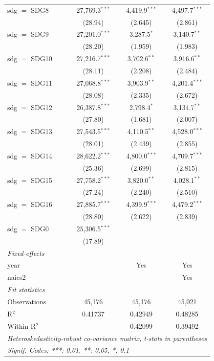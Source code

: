 \begin{tabular}{lccc}
   sdg $=$ SDG8  & 27,769.3$^{***}$ & 4,419.9$^{***}$ & 4,497.7$^{***}$\\   
                 & (28.94)          & (2.645)         & (2.861)\\   
   sdg $=$ SDG9  & 27,201.0$^{***}$ & 3,287.5$^{*}$   & 3,140.7$^{**}$\\   
                 & (28.20)          & (1.959)         & (1.983)\\   
   sdg $=$ SDG10 & 27,216.7$^{***}$ & 3,702.6$^{**}$  & 3,916.6$^{**}$\\   
                 & (28.11)          & (2.208)         & (2.484)\\   
   sdg $=$ SDG11 & 27,068.8$^{***}$ & 3,903.9$^{**}$  & 4,201.4$^{***}$\\   
                 & (28.08)          & (2.335)         & (2.672)\\   
   sdg $=$ SDG12 & 26,387.8$^{***}$ & 2,798.4$^{*}$   & 3,134.7$^{**}$\\   
                 & (27.80)          & (1.681)         & (2.007)\\   
   sdg $=$ SDG13 & 27,543.5$^{***}$ & 4,110.5$^{**}$  & 4,528.0$^{***}$\\   
                 & (28.01)          & (2.439)         & (2.855)\\   
   sdg $=$ SDG14 & 28,622.2$^{***}$ & 4,800.0$^{***}$ & 4,709.7$^{***}$\\   
                 & (25.36)          & (2.699)         & (2.815)\\   
   sdg $=$ SDG15 & 27,758.2$^{***}$ & 3,820.0$^{**}$  & 4,028.1$^{**}$\\   
                 & (27.24)          & (2.240)         & (2.510)\\   
   sdg $=$ SDG16 & 27,885.7$^{***}$ & 4,399.9$^{***}$ & 4,479.2$^{***}$\\   
                 & (28.80)          & (2.622)         & (2.839)\\   
   sdg $=$ SDG0  & 25,306.5$^{***}$ &                 &   \\   
                 & (17.89)          &                 &   \\   
   \midrule
   \emph{Fixed-effects}\\
   year          &                  & Yes             & Yes\\  
   naics2        &                  &                 & Yes\\  
   \midrule
   \emph{Fit statistics}\\
   Observations  & 45,176           & 45,176          & 45,021\\  
   R$^2$         & 0.41737          & 0.42949         & 0.48285\\  
   Within R$^2$  &                  & 0.42099         & 0.39492\\  
   \midrule \midrule
   \multicolumn{4}{l}{\emph{Heteroskedasticity-robust co-variance matrix, t-stats in parentheses}}\\
   \multicolumn{4}{l}{\emph{Signif. Codes: ***: 0.01, **: 0.05, *: 0.1}}\\
\end{tabular}
\par\endgroup


